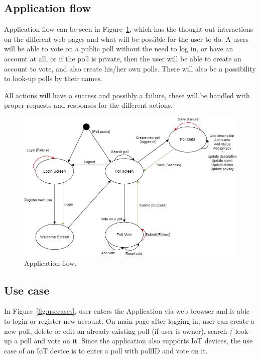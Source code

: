 \subsection{Application flow}
\label{sub:appflow}
Application flow can be seen in Figure~\ref{fig:applicationflow}, which has the thought out interactions on the different web pages and what will be possible for the user to do. A users will be able to vote on a public poll without the need to log in, or have an account at all, or if the poll is private, then the user will be able to create an account to vote, and also create his/her own polls. There will also be a possibility to look-up polls by their names.

All actions will have a success and possibly a failure, these will be handled with proper requests and responses for the different actions.
\begin{figure}[H]
  \centering
  \includegraphics[scale=0.5]{figs/applicationflow.png}
  \caption[scale=0.5]{Application flow.}
  \label{fig:applicationflow}
\end{figure}

\subsection{Use case}
\label{sub:usecase}
In Figure~\ref{fig:usecases}, user enters the Application via web browser and is able to login or register new account. On main page after logging in; user can create a new poll, delete or edit an already existing poll (if user is owner), search / look-up a poll and vote on it. Since the application also supports IoT devices, the use case of an IoT device is to enter a poll with pollID and vote on it.

